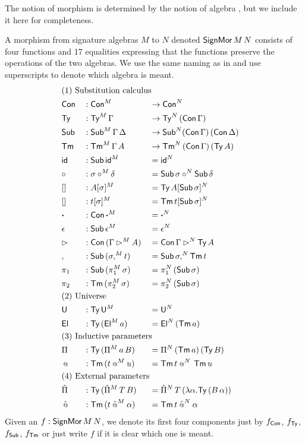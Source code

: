 \documentclass[a4paper,UKenglish,cleveref, autoref]{lipics-v2019}
\begin{document}
The notion of morphism is determined by the notion of algebra
\cite{large_inf_qiit}, but we include it here for completeness.
\begin{definition}\label{def:morphism}
  A morphism from signature algebras $M$ to $N$ denoted
  $\mathsf{SignMor}\,M\,N$ consists of four functions and 17 equalities
  expressing that the functions preserve the operations of the two
  algebras. We use the same naming as in  and use
  superscripts to denote which algebra is meant.
\begin{alignat*}{5}
  & \rlap{(1) Substitution calculus} \\
  & \Con && : \Con^M && \ra\Con^N \\
  & \Ty  && : \Ty^M\,\Gamma && \ra\Ty^N\,(\Con\,\Gamma) \\
  & \Sub  && : \Sub^M\,\Gamma\,\Delta && \ra\Sub^N(\Con\,\Gamma)\,(\Con\,\Delta) \\
  & \Tm  && : \Tm^M\,\Gamma\,A && \ra\Tm^N\,(\Con\,\Gamma)\,(\Ty\,A) \\
  & \id && : \Sub\,\id^M && = \id^N \\
  & {\circ} && : \sigma\circ^M\delta && = \Sub\,\sigma\circ^N\Sub\,\delta \\
  & [] && : A[\sigma]^M && = \Ty\,A[\Sub\,\sigma]^N \\
  & [] && : t[\sigma]^M && = \Tm\,t[\Sub\,\sigma]^N \\
  & \boldsymbol{\cdot} && : \Con\,\boldsymbol{\cdot}^M && = \boldsymbol{\cdot}^N \\
  & \epsilon && : \Sub\,\epsilon^M && = \epsilon^N \\
  & \ext && : \Con\,(\Gamma\ext^M A) && = \Con\,\Gamma\ext^N\Ty\,A \\
  & , && : \Sub\,(\sigma,^M t) && = \Sub\,\sigma ,^N\Tm\,t \\
  & \pi_1 && : \Sub\,(\pi_1^M\,\sigma) && = \pi_1^N\,(\Sub\,\sigma) \\
  & \pi_2 && : \Tm\,(\pi_2^M\,\sigma) && = \pi_2^N\,(\Sub\,\sigma) \\
  & \rlap{(2) Universe} \\
  & \U && : \Ty\,\U^M && = \U^N \\
  & \El && : \Ty\,(\El^M\,a) && = \El^N\,(\Tm\,a) \\
  & \rlap{(3) Inductive parameters} \\
  & \Pi && : \Ty\,(\Pi^M\,a\,B) && = \Pi^N\,(\Tm\,a)\,(\Ty\,B) \\
  & \oldapp && : \Tm\,(t\mathbin{{\oldapp}^M} u) && = \Tm\,t\mathbin{{\oldapp}^N}\,\Tm\,u \\
  & \rlap{(4) External parameters} \\
  & \Pim && : \Ty\,(\Pim^M\,T\,B) && = \Pim^N\,T\,(\lambda\alpha.\Ty\,(B\,\alpha)) \\
  & \appm && : \Tm\,(t\mathbin{{\appm}^M}\alpha) && = \Tm\,t\mathbin{{\appm}^N}\alpha
\end{alignat*}
Given an $f:\mathsf{SignMor}\,M\,N$, we denote its first four components just
by $f_{\mathsf{Con}}$, $f_{\mathsf{Ty}}$, $f_{\mathsf{Sub}}$, $f_{\mathsf{Tm}}$ or just write $f$ if it is
clear which one is meant.
\end{definition}
\end{document}
